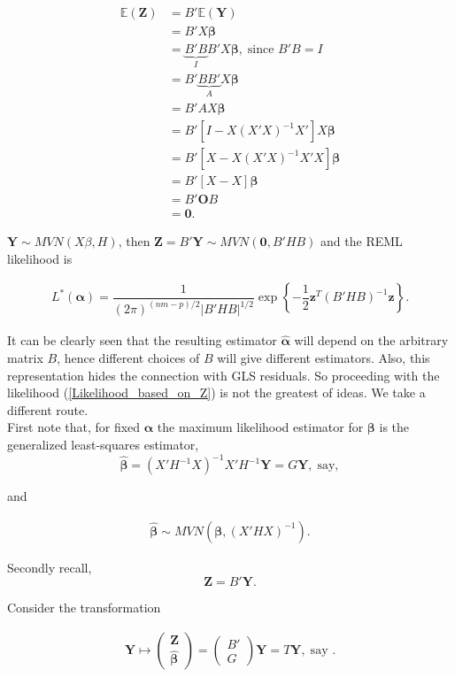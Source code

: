 \documentclass[11pt, a4paper]{article}
\newcommand{\bs}[1]{\boldsymbol{#1}}
\begin{document}
\begin{align*}
\mathbb{E}(\bs{Z}) &= B'\mathbb{E}(\bs{Y}) \\[0.5em]
&= B'X\bs{\beta} \\[0.5em]
&= \underbrace{B'B}_{I}B'X\bs{\beta}, \; \text{since } B'B = I \\[0.5em]
&= B'\underbrace{BB'}_{A}X\bs{\beta} \\[0.5em]
&= B'AX\bs{\beta} \\[0.5em]
&= B' \left[ I - X(X'X)^{-1}X' \right]X\bs{\beta} \\[0.5em]
&= B' \left[ X - X(X'X)^{-1}X'X \right] \bs{\beta} \\[0.5em]
&= B' \left[ X - X \right] \bs{\beta} \\[0.5em]
&= B' \bs{O} B \\[0.5em]
&= \bs{0}.
\end{align*}

$\bs{Y} \sim MVN(X\beta, H)$, then $\bs{Z} = B'\bs{Y} \sim MVN(\bs{0}, B'HB)$ and the REML likelihood is

\begin{align}\label{Likelihood_based_on_Z}
L^{*}(\bs{\alpha})
=
\dfrac{1}{(2\pi)^{(nm-p)/2}\lvert B'HB \rvert^{1/2}}
\exp\!\left\{
-\dfrac{1}{2}
\bs{z}^{T}(B'HB)^{-1}\bs{z}
\right\}.
\end{align}

It can be clearly seen that the resulting estimator $\widehat{\bs{\alpha}}$ will depend on the arbitrary matrix $B$, hence different choices of $B$ will give different estimators. Also, this representation hides the connection with GLS residuals. So proceeding with the likelihood (\ref{Likelihood_based_on_Z}) is not the greatest of ideas. We take a different route. \\[0.5em]

First note that, for fixed $\bs{\alpha}$ the maximum likelihood estimator for $\bs{\beta}$ is the generalized least-squares estimator,
\[
\widehat{\bs{\beta}}
=
(X'H^{-1}X)^{-1}X'H^{-1}\bs{Y}
=
G\bs{Y}, \; \text{say},
\]

and

\begin{align}\label{distribution_of_beta_hat}
\widehat{\bs{\beta}} \sim MVN(\bs{\beta}, (X'HX)^{-1}).
\end{align}

Secondly recall, $$\bs{Z} = B'\bs{Y}.$$

Consider the transformation

\begin{align*}
\bs{Y}
\mapsto
\begin{pmatrix}
\bs{Z} \\
\widehat{\bs{\beta}}
\end{pmatrix}
=
\begin{pmatrix}
B' \\
G
\end{pmatrix}
\bs{Y}
= T\bs{Y}, \; \text{say }.
\end{align*}
\end{document}
